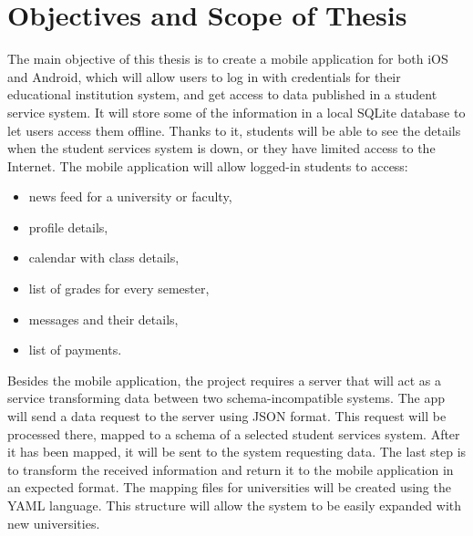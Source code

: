 \section{Objectives and Scope of Thesis}
The main objective of this thesis is to create a mobile application for both iOS and Android, which will allow users to log in with credentials for their educational institution system, and get access to data published in a student service system. It will store some of the information in a local SQLite database to let users access them offline. Thanks to it, students will be able to see the details when the student services system is down, or they have limited access to the Internet. 
The mobile application will allow logged-in students to access:
\begin{multicols}{2}
\begin{itemize}
    \item news feed for a university or faculty,
    \item profile details,
    \item calendar with class details,
    \item list of grades for every semester,
    \item messages and their details,
    \item list of payments.
\end{itemize}
\end{multicols}
Besides the mobile application, the project requires a server that will act as a service transforming data between two schema-incompatible systems. The app will send a data request to the server using JSON format. This request will be processed there, mapped to a schema of a selected student services system. After it has been mapped, it will be sent to the system requesting data. The last step is to transform the received information and return it to the mobile application in an expected format. The mapping files for universities will be created using the YAML language. This structure will allow the system to be easily expanded with new universities.

